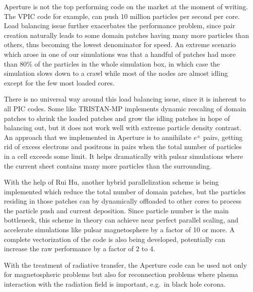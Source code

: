 Aperture is not the top performing code on the market at the moment of writing.
The VPIC code for example, can push 10 million particles per second per core.
Load balancing issue further exacerbates the performance problem, since pair
creation naturally leads to some domain patches having many more particles than
others, thus becoming the lowest denominator for speed. An extreme scenario
which arose in one of our simulations was that a handful of patches had more
than 80\% of the particles in the whole simulation box, in which case the
simulation slows down to a crawl while most of the nodes are almost idling
except for the few most loaded cores.

There is no universal way around this load balancing issue, since it is inherent
to all PIC codes. Some like TRISTAN-MP implements dynamic rescaling of domain
patches to shrink the loaded patches and grow the idling patches in hope of
balancing out, but it does not work well with extreme particle density contrast.
An approach that we implemented in Aperture is to annihilate $e^{\pm}$ pairs, getting
rid of excess electrons and positrons in pairs when the total number of
particles in a cell exceeds some limit. It helps dramatically with pulsar
simulations where the current sheet contains many more particles than the
surrounding.

With the help of Rui Hu, another hybrid parallelization scheme is being
implemented which reduce the total number of domain patches, but the particles
residing in those patches can by dynamically offloaded to other cores to process
the particle push and current deposition. Since particle number is the main
bottleneck, this scheme in theory can achieve near perfect parallel scaling, and
accelerate simulations like pulsar magnetosphere by a factor of 10 or more. A
complete vectorization of the code is also being developed, potentially can
increase the raw performance by a factor of 2 to 4.

With the treatment of radiative transfer, the Aperture code can be used not only
for magnetospheric problems but also for reconnection problems where plasma
interaction with the radiation field is important, e.g.\ in black hole corona.

